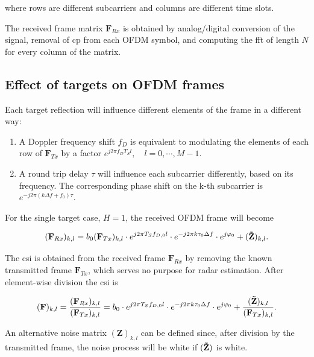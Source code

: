     where rows are different subcarriers and columns are different time slots.
    
    The received frame matrix $\mathbf F_{Rx}$ is obtained by analog/digital conversion of the signal, removal of \gls{cp} from each OFDM symbol, and computing the \gls{fft} of length $N$ for every column of the matrix.
    
    \subsection{Effect of targets on OFDM frames}
    Each target reflection will influence different elements of the frame in a different way:
    
    \begin{enumerate}
        \item A Doppler frequency shift $f_D$ is equivalent to modulating the elements of each row of $\mathbf F_{Tx}$ by a factor $e^{j2\pi f_D T_S l},\quad  l = 0, \cdots, M-1$.
        \item A round trip delay $\tau$ will influence each subcarrier differently, based on its frequency. The corresponding phase shift on the k-th subcarrier is $e^{-j2\pi (k\Delta f + f_0)\tau}$.
    \end{enumerate}
    
    For the single target case, $H=1$, the received OFDM frame will become
    
    \begin{equation*}
        (\mathbf F_{Rx})_{k,l} = b_0(\mathbf F_{Tx})_{k,l} \cdot e^{j2\pi T_S f_{D,0} l}\cdot e^{-j2\pi k \tau_0 \Delta f} \cdot e^{j\varphi_0} + (\mathbf{\Tilde{Z}})_{k,l}.
    \end{equation*}
    
    The \gls{csi} is obtained from the received frame $\mathbf{F}_{Rx}$ by removing the known transmitted frame $\mathbf{F}_{Tx}$, which serves no purpose for radar estimation. After element-wise division the \gls{csi} is
    
    \begin{equation}
        (\mathbf F)_{k,l} = \frac{(\mathbf F_{Rx})_{k,l}}{(\mathbf F_{Tx})_{k,l}} = b_0 \cdot e^{j2\pi T_S f_{D,0} l}\cdot e^{-j2\pi k \tau_0 \Delta f} \cdot e^{j\varphi_0} + \frac{(\mathbf{\Tilde{Z}})_{k,l}}{(\mathbf F_{Tx})_{k,l}}\label{eq:CSI_frame}.    
    \end{equation}
    
    An alternative noise matrix $(\mathbf{Z})_{k,l}$ can be defined since, after division by the transmitted frame, the noise process will be white if $(\mathbf{\Tilde{Z}})$ is white.
    
